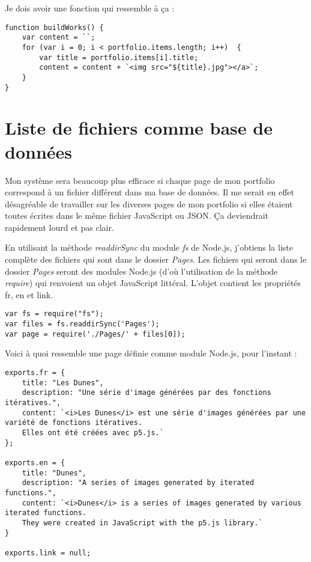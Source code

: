 Je dois avoir une fonction qui ressemble à ça :

\begin{lstlisting}
function buildWorks() {
    var content = ``;
    for (var i = 0; i < portfolio.items.length; i++)  {
        var title = portfolio.items[i].title;
        content = content + `<img src="${title}.jpg"></a>`;
    }
}
\end{lstlisting}
\clearpage
\section{Liste de fichiers comme base de données}
Mon système sera beaucoup plus efficace si chaque page de mon portfolio correspond à un fichier différent dans ma base de données. Il me serait en effet désagréable de travailler sur les diverses pages de mon portfolio si elles étaient toutes écrites dans le même fichier JavaScript ou JSON. Ça deviendrait rapidement lourd et pas clair.

En utilisant la méthode \textit{readdirSync} du module \textit{fs} de Node.js, j'obtiens la liste complète des fichiers qui sont dans le dossier \textit{Pages}. Les fichiers qui seront dans le dossier \textit{Pages} seront des modules Node.js (d'où l'utilisation de la méthode \textit{require}) qui renvoient un objet JavaScript littéral. L'objet contient les propriétés fr, en et link.

\begin{lstlisting}
var fs = require("fs");
var files = fs.readdirSync('Pages');
var page = require('./Pages/' + files[0]);
\end{lstlisting}

Voici à quoi ressemble une page définie comme module Node.js, pour l'instant :
\begin{lstlisting}
exports.fr = {
    title: "Les Dunes",
    description: "Une série d'image générées par des fonctions itératives.",
    content: `<i>Les Dunes</i> est une série d'images générées par une variété de fonctions itératives.
    Elles ont été créées avec p5.js.`
};

exports.en = {
    title: "Dunes",
    description: "A series of images generated by iterated functions.",
    content: `<i>Dunes</i> is a series of images generated by various iterated functions. 
    They were created in JavaScript with the p5.js library.`
}

exports.link = null;
\end{lstlisting}

